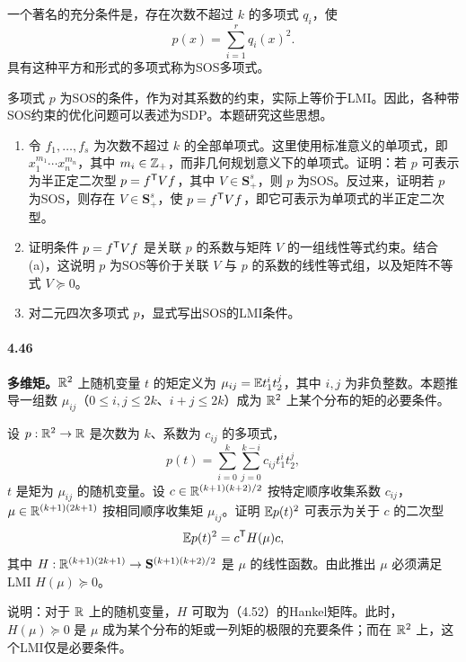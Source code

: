 一个著名的充分条件是，存在次数不超过 $k$ 的多项式 $q_i$，使
\[
p(x)=\sum_{i=1}^r q_i(x)^2.
\]
具有这种平方和形式的多项式称为SOS多项式。

多项式 $p$ 为SOS的条件，作为对其系数的约束，实际上等价于LMI。因此，各种带SOS约束的优化问题可以表述为SDP。本题研究这些思想。
\begin{enumerate}[label=(\alph*)]
\item 令 $f_1,\ldots,f_s$ 为次数不超过 $k$ 的全部单项式。这里使用标准意义的单项式，即 $x_1^{m_1}\cdots x_n^{m_n}$，其中 $m_i\in\mathbb Z_+$，而非几何规划意义下的单项式。证明：若 $p$ 可表示为半正定二次型 $p=f^\mathsf T Vf$，其中 $V\in\mathbf S_+^s$，则 $p$ 为SOS。反过来，证明若 $p$ 为SOS，则存在 $V\in\mathbf S_+^s$，使 $p=f^\mathsf T Vf$，即它可表示为单项式的半正定二次型。
\item 证明条件 $p=f^\mathsf T Vf$ 是关联 $p$ 的系数与矩阵 $V$ 的一组线性等式约束。结合(a)，这说明 $p$ 为SOS等价于关联 $V$ 与 $p$ 的系数的线性等式组，以及矩阵不等式 $V\succeq0$。
\item 对二元四次多项式 $p$，显式写出SOS的LMI条件。
\end{enumerate}

\paragraph{4.46}\textbf{多维矩。}$\mathbb R^2$ 上随机变量 $t$ 的矩定义为 $\mu_{ij}=\mathbb E t_1^it_2^j$，其中 $i,j$ 为非负整数。本题推导一组数 $\mu_{ij}$（$0\le i,j\le2k$、$i+j\le2k$）成为 $\mathbb R^2$ 上某个分布的矩的必要条件。

设 $p:\mathbb R^2\to\mathbb R$ 是次数为 $k$、系数为 $c_{ij}$ 的多项式，
\[
p(t)=\sum_{i=0}^k\sum_{j=0}^{k-i}c_{ij}t_1^it_2^j,
\]
$t$ 是矩为 $\mu_{ij}$ 的随机变量。设 $c\in\mathbb R^{(k+1)(k+2)/2}$ 按特定顺序收集系数 $c_{ij}$，$\mu\in\mathbb R^{(k+1)(2k+1)}$ 按相同顺序收集矩 $\mu_{ij}$。证明 $\mathbb E p(t)^2$ 可表示为关于 $c$ 的二次型
\[
\mathbb E p(t)^2=c^\mathsf T H(\mu)c,
\]
其中 $H:\mathbb R^{(k+1)(2k+1)}\to\mathbf S^{(k+1)(k+2)/2}$ 是 $\mu$ 的线性函数。由此推出 $\mu$ 必须满足LMI $H(\mu)\succeq0$。

说明：对于 $\mathbb R$ 上的随机变量，$H$ 可取为（4.52）的Hankel矩阵。此时，$H(\mu)\succeq0$ 是 $\mu$ 成为某个分布的矩或一列矩的极限的充要条件；而在 $\mathbb R^2$ 上，这个LMI仅是必要条件。

